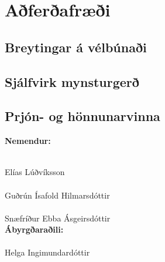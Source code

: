 \documentclass[a4paper,12pt,twoside]{article}
\begin{document}
\section{Aðferðafræði}\label{sec:adferdafraedi}
\subsection{Breytingar á vélbúnaði}

\subsection{Sjálfvirk mynsturgerð}

\subsection{Prjón- og hönnunarvinna}


\newpage
\printbibliography
\fancyfoot{} %

\begin{center}
\textbf{Nemendur:}
\vspace{2cm}

\underline{\hspace{8cm}} \\
Elías Lúðvíksson \\[1.5cm]

\underline{\hspace{8cm}} \\
Guðrún Ísafold Hilmarsdóttir \\[1.5cm]

\underline{\hspace{8cm}} \\
Snæfríður Ebba Ásgeirsdóttir \\[2cm]

\textbf{Ábyrgðaraðili:} \\[1.5cm]
\underline{\hspace{8cm}} \\
Helga Ingimundardóttir

\end{center}
\end{document}
